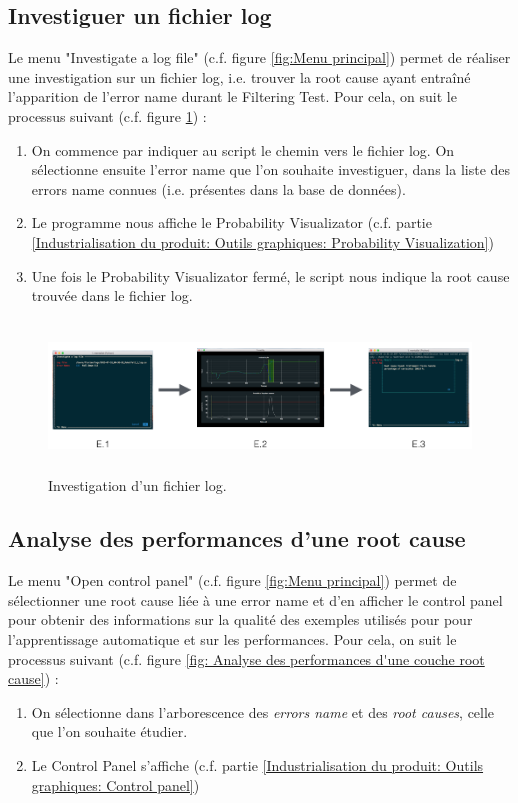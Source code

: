 \subsection{Investiguer un fichier log}
\label{Industrialisation du produit: Utilisation suggérée des outils: Investiguer}
Le menu "Investigate a log file" (c.f. figure \ref{fig:Menu principal}) permet de réaliser une investigation sur un fichier log, i.e. trouver la root cause ayant entraîné l'apparition de l'error name durant le Filtering Test. Pour cela, on suit le processus suivant (c.f. figure \ref{fig: Investigation d'un fichier log}) : 
\begin{enumerate}
	\item On commence par indiquer au script le chemin vers le fichier log. On sélectionne ensuite l'error name que l'on souhaite investiguer, dans la liste des errors name connues (i.e. présentes dans la base de données).
	\item Le programme nous affiche le Probability Visualizator (c.f. partie \ref{Industrialisation du produit: Outils graphiques: Probability Visualization})
	\item Une fois le Probability Visualizator fermé, le script nous indique la root cause trouvée dans le fichier log. 
\end{enumerate}

\begin{figure}[H]
	\centering\includegraphics[height=4cm]{images/invest_menu.png}
	\caption[Investigation d'un fichier log]{Investigation d'un fichier log.}
	\label{fig: Investigation d'un fichier log}
\end{figure} 

\subsection{Analyse des performances d'une  root cause}
\label{Industrialisation du produit: Utilisation suggérée des outils: Analyse des performances d'une  root cause}
Le menu "Open control panel" (c.f. figure \ref{fig:Menu principal}) permet de sélectionner une root cause liée à une error name et d'en afficher le control panel pour obtenir des informations sur la qualité des exemples utilisés pour pour l'apprentissage automatique et sur les performances. Pour cela, on suit le processus suivant (c.f. figure \ref{fig: Analyse des performances d'une couche root cause}) : 
\begin{enumerate}
	\item On sélectionne dans l'arborescence des \emph{errors name} et des\emph{ root causes}, celle que l'on souhaite étudier.
	\item Le Control Panel s'affiche (c.f. partie \ref{Industrialisation du produit: Outils graphiques: Control panel})
\end{enumerate}

